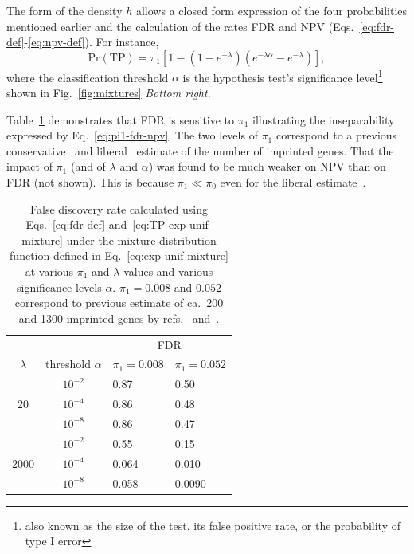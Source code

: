 \documentclass[letterpaper]{article}
\begin{document}
The form of the density \(h\) allows a closed form expression of the four
probabilities mentioned earlier and the calculation of the rates FDR and NPV
(Eqs.~\ref{eq:fdr-def}-\ref{eq:npv-def}).  For instance,
\begin{equation}
\label{eq:TP-exp-unif-mixture}
\mathrm{Pr}(\mathrm{TP}) = \pi_1 [1 - (1 - e^{-\lambda}) (e^{-\lambda \alpha} -
e^{-\lambda})],
\end{equation}
where the classification threshold \(\alpha\) is the hypothesis test's
significance level\footnote{ also known as the size of the test, its false
positive rate, or the probability of type I error } shown in
Fig.~\ref{fig:mixtures} \emph{Bottom right}.

Table~\ref{tab:fdr-exp-unif-mixture} demonstrates that FDR is sensitive to
\(\pi_1\) illustrating the inseparability expressed by
Eq.~\ref{eq:pi1-fdr-npv}.  The two levels of \(\pi_1\) correspond to a
previous conservative~\cite{DeVeale2012} and liberal~\cite{Gregg2010} estimate
of the number of imprinted genes.  That the impact of \(\pi_1\) (and of
\(\lambda\) and \(\alpha\)) was found to be much weaker on  NPV than on FDR
(not shown).  This is because \(\pi_1 \ll \pi_0\) even for the liberal
estimate~\cite{Gregg2010}.

\begin{table}[b]

\begin{center}
\begin{tabular}{cc|ll|}
 & & \multicolumn{2}{c}{FDR} \\
 \(\lambda\) & threshold \(\alpha\) & \(\pi_1=0.008\) & \(\pi_1=0.052\) \\
\hline
 & \(10^{-2}\) & 0.87 & 0.50 \\
 20 & \(10^{-4}\) & 0.86 & 0.48 \\
 & \(10^{-8}\) & 0.86 & 0.47 \\
\hline
 & \(10^{-2}\) & 0.55 & 0.15 \\
 2000 & \(10^{-4}\) & 0.064 & 0.010 \\
 & \(10^{-8}\) & 0.058 & 0.0090 \\
\hline
\end{tabular}
\end{center}
\caption{
False discovery rate calculated using
Eqs.~\ref{eq:fdr-def} and~\ref{eq:TP-exp-unif-mixture} under the mixture distribution
function defined in Eq.~\ref{eq:exp-unif-mixture} at various \(\pi_1\) and \(\lambda\) values and various significance
levels \(\alpha\).  \(\pi_1=0.008\) and \(0.052\) correspond to
previous estimate of ca.~200 and 1300 imprinted genes by
refs.~\cite{DeVeale2012} and~\cite{Gregg2010}.
}
\label{tab:fdr-exp-unif-mixture}
\end{table}
\end{document}
